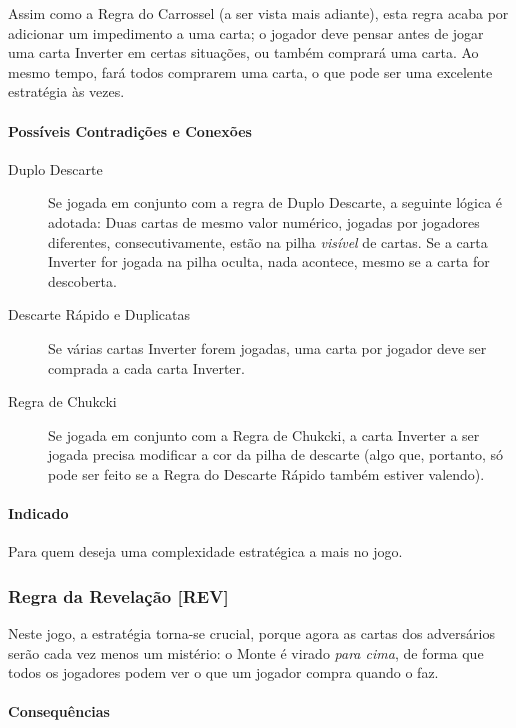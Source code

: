 Assim como a Regra do Carrossel (a ser vista mais adiante), esta regra acaba por adicionar um impedimento a uma carta; o jogador deve pensar antes de jogar uma carta Inverter em certas situações, ou também comprará uma carta. Ao mesmo tempo, fará todos comprarem uma carta, o que pode ser uma excelente estratégia às vezes.

\paragraph{Possíveis Contradições e Conexões}

\begin{description}
\item[Duplo Descarte]{Se jogada em conjunto com a regra de Duplo Descarte, a seguinte lógica é adotada: Duas cartas de mesmo valor numérico, jogadas por jogadores diferentes, consecutivamente, estão na pilha \emph{visível} de cartas. Se a carta Inverter for jogada na pilha oculta, nada acontece, mesmo se a carta for descoberta.}
\item[Descarte Rápido e Duplicatas]{Se várias cartas Inverter forem jogadas, uma carta por jogador deve ser comprada a cada carta Inverter.}
\item[Regra de Chukcki]{Se jogada em conjunto com a Regra de Chukcki, a carta Inverter a ser jogada precisa modificar a cor da pilha de descarte (algo que, portanto, só pode ser feito se a Regra do Descarte Rápido também estiver valendo).}
\end{description}

\paragraph{Indicado}

Para quem deseja uma complexidade estratégica a mais no jogo.

\subsubsection{Regra da Revelação [REV]}

Neste jogo, a estratégia torna-se crucial, porque agora as cartas dos adversários serão cada vez menos um mistério: o Monte é virado \emph{para cima}, de forma que todos os jogadores podem ver o que um jogador compra quando o faz.

\paragraph{Consequências}

